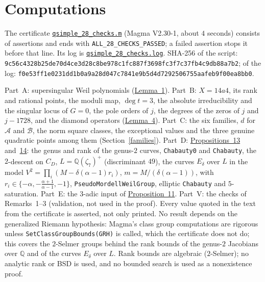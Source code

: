 \documentclass[11pt]{article}
\newcommand{\Q}{\mathbb Q}
\begin{document}
\section{Computations}\label{computations}

The certificate
\href{https://genus-2-torsion.github.io/data/knowledge/sources/qsimple_28_checks.m}{\texttt{qsimple\_28\_checks.m}}
(Magma V2.30-1, about \(4\) seconds) consists of assertions and ends with \texttt{ALL\_28\_CHECKS\_PASSED}; a failed
assertion stops it before that line. Its log is
\href{https://genus-2-torsion.github.io/data/knowledge/sources/qsimple_28_checks.log}{\texttt{qsimple\_28\_checks.log}}.
SHA-256 of the script:
\texttt{9c56c4328b25de70\allowbreak d4ce3d28c8be978c\allowbreak 1fc887f3698fc3f7\allowbreak c37fb4c9db88a7b2};
of the log:
\texttt{f0e53ff1e0231dd1\allowbreak b0a9a28d047c7841\allowbreak e9b5d4d729250675\allowbreak 5aafeb9f00ea8bb0}.

Part~A: supersingular Weil polynomials (\hyperref[lemma-ss]{Lemma~1}). Part~B: \(X=14a4\), its rank and rational points, the
moduli map, \(\deg t=3\), the absolute irreducibility and the singular locus of \(G=0\), the pole orders of \(j\), the
degrees of the zeros of \(j\) and \(j-1728\), and the diamond operators (\hyperref[lemma-model]{Lemma~4}). Part~C: the six
families, \(d\) for \(\mathcal A\) and \(\mathcal B\), the norm square classes, the exceptional values and the three
genuine quadratic points among them (Section~\ref{families}). Part~D: \hyperref[prop-B]{Propositions~13} and~\hyperref[prop-A]{14}: the
genus and rank of the genus-\(2\) curves, \texttt{Chabauty0} and \texttt{Chabauty}, the \(2\)-descent on \(C_D\),
\(L=\Q(\zeta_7)^+\) (discriminant \(49\)), the curves \(E_\delta\) over \(L\) in the model
\(V^2=\prod_i(M-\delta(\alpha-1)r_i)\), \(m=M/(\delta(\alpha-1))\), with
\(r_i\in\{-\alpha,-\frac{\alpha+1}{\alpha-1},-1\}\), \texttt{PseudoMordellWeilGroup}, elliptic \texttt{Chabauty}
and \(5\)-saturation. Part~E: the \(3\)-adic input of \hyperref[prop-square]{Proposition~11}. Part~V: the checks of
Remarks~1--3 (validation, not used in the proof). Every value quoted in the text from the certificate is asserted,
not only printed. No result depends on the generalized Riemann hypothesis: Magma's class group computations are
rigorous unless \texttt{SetClassGroupBounds({}GRH{})} is called, which the certificate does not do; this
covers the \(2\)-Selmer groups behind the rank bounds of the genus-\(2\) Jacobians over \(\Q\) and of the curves
\(E_\delta\) over \(L\). Rank bounds are algebraic (\(2\)-Selmer); no analytic rank or BSD is used, and no bounded
search is used as a nonexistence proof.
\end{document}
